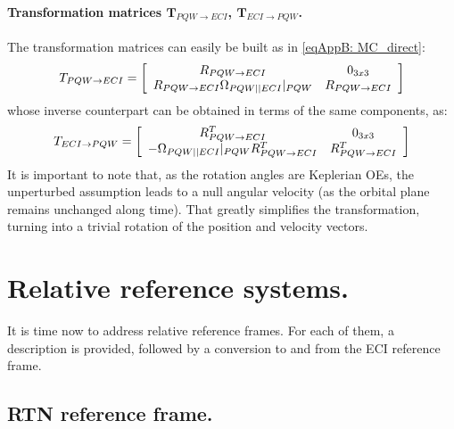 			\paragraph{Transformation matrices $\bm T_{PQW\rightarrow ECI}$, $\bm T_{ECI\rightarrow PQW}$. \\}
			\indent The transformation matrices can easily be built as in \eqref{eqAppB: 	MC_direct}:
			\[
			 T_{PQW\to ECI} = \left[\begin{array}{cc}
	R_{PQW\to ECI} & 0_{3x3} \\
	R_{PQW\to ECI} \Omega_{PQW \vert \vert ECI}\rvert_{PQW} & R_{PQW\to ECI}
	\end{array}\right]
			\]
			\noindent whose inverse counterpart can be obtained in terms of the same components, as:
			\[
			 T_{ECI\to PQW} = \left[\begin{array}{cc}
	R_{PQW\to ECI}^T & 0_{3x3} \\
	-\Omega_{PQW \vert \vert ECI}\rvert_{PQW} R_{PQW\to ECI}^T & R_{PQW\to ECI}^T
	\end{array}\right]
			\]
			\indent It is important to note that, as the rotation angles are Keplerian OEs, the unperturbed assumption leads to a null angular velocity (as the orbital plane remains unchanged along time). That greatly simplifies the transformation, turning into a trivial rotation of the position and velocity vectors.
		
\section{Relative reference systems.}
%
\indent It is time now to address relative reference frames. For each of them, a description is provided, followed by a conversion to and from the ECI reference frame. 
%
	\subsection{RTN reference frame.} \label{sec: RTN}
